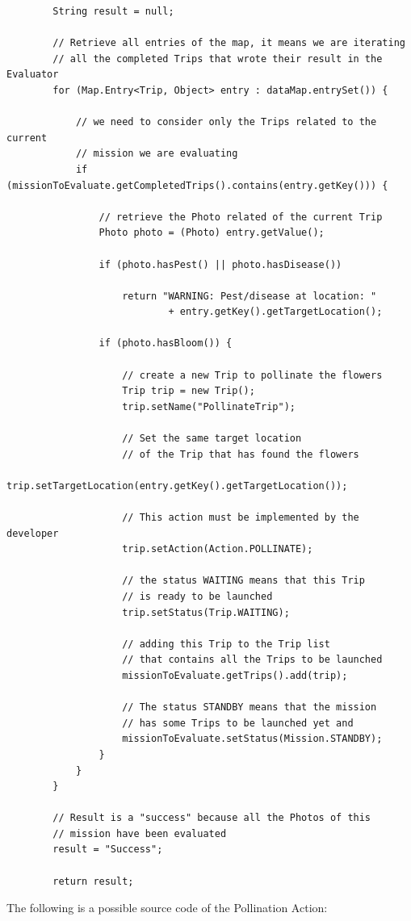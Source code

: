 \begin{lstlisting}
		String result = null;

		// Retrieve all entries of the map, it means we are iterating
        // all the completed Trips that wrote their result in the Evaluator
		for (Map.Entry<Trip, Object> entry : dataMap.entrySet()) {

			// we need to consider only the Trips related to the current
            // mission we are evaluating
			if (missionToEvaluate.getCompletedTrips().contains(entry.getKey())) {
				
				// retrieve the Photo related of the current Trip
				Photo photo = (Photo) entry.getValue();
				
				if (photo.hasPest() || photo.hasDisease())
					
					return "WARNING: Pest/disease at location: "
							+ entry.getKey().getTargetLocation();

				if (photo.hasBloom()) {

					// create a new Trip to pollinate the flowers
					Trip trip = new Trip();
					trip.setName("PollinateTrip");
                    
                    // Set the same target location
                    // of the Trip that has found the flowers
					trip.setTargetLocation(entry.getKey().getTargetLocation());
                    
                    // This action must be implemented by the developer
					trip.setAction(Action.POLLINATE);
                    
                    // the status WAITING means that this Trip
                    // is ready to be launched
					trip.setStatus(Trip.WAITING);

					// adding this Trip to the Trip list
                    // that contains all the Trips to be launched
					missionToEvaluate.getTrips().add(trip);
                    
					// The status STANDBY means that the mission
                    // has some Trips to be launched yet and
					missionToEvaluate.setStatus(Mission.STANDBY);
				}
			}
		}

		// Result is a "success" because all the Photos of this 
        // mission have been evaluated
		result = "Success";
        
		return result;
\end{lstlisting}

The following is a possible source code of the Pollination Action:

